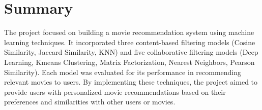 \documentclass[a4paper]{article}
\theoremstyle{plain}
\theoremstyle{definition}
\begin{document}
	
 \bigskip
 \bigskip
 \bigskip
 \bigskip
     
	\section{\LARGE Summary}
	\label{sec:app}
	{\fontsize{12}{15}\selectfont The project focused on building a movie recommendation system using machine learning techniques. It incorporated three content-based filtering models (Cosine Similarity, Jaccard Similarity, KNN) and five collaborative filtering models (Deep Learning, Kmeans Clustering, Matrix Factorization, Nearest Neighbors, Pearson Similarity). Each model was evaluated for its performance in recommending relevant movies to users. By implementing these techniques, the project aimed to provide users with personalized movie recommendations based on their preferences and similarities with other users or movies.}
	

	
	
	\newpage
\end{document}
